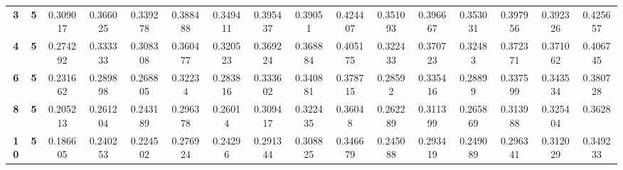 \begin{sidewaystable}[!p]
\begin{tabular}{>{\bfseries}c>{\bfseries}cSSSSSSSSSSSSSS}
		3    & 5   & 0.309017   & 0.366025 & 0.339278   & 0.388488 & 0.349411   & 0.395437 & 0.39051    & 0.424407 & 0.351093   & 0.396667 & 0.353031   & 0.397956 & 0.392326   & 0.425657 \\
		4    & 5   & 0.274292   & 0.333333 & 0.308308   & 0.360477 & 0.320523   & 0.369224 & 0.368884   & 0.405175 & 0.322433   & 0.370723 & 0.32483    & 0.372371 & 0.371062   & 0.406745 \\
		6    & 5   & 0.231662   & 0.289898 & 0.268805   & 0.32234  & 0.283816   & 0.333602 & 0.340881   & 0.378715 & 0.28592    & 0.335416 & 0.28899    & 0.337599 & 0.343534   & 0.380728 \\
		8    & 5   & 0.205213   & 0.261204 & 0.243189   & 0.296378 & 0.26014    & 0.309417 & 0.322435   & 0.36048  & 0.262289   & 0.311399 & 0.265869   & 0.313988 & 0.325404   & 0.3628   \\
		10   & 5   & 0.186605   & 0.240253 & 0.224502   & 0.276924 & 0.24296    & 0.291344 & 0.308825   & 0.346679 & 0.245088   & 0.293419 & 0.249089   & 0.296341 & 0.312029   & 0.349233 \\ \bottomrule
	\end{tabular}

	\bigskip\bigskip  %


\end{sidewaystable}
